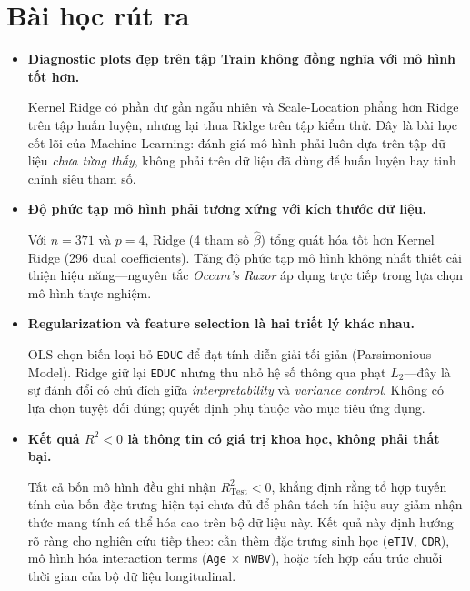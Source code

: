 \newpage

\section{Bài học rút ra}

\begin{itemize}
  \item \textbf{Diagnostic plots đẹp trên tập Train không đồng nghĩa với mô
        hình tốt hơn.}

        Kernel Ridge có phần dư gần ngẫu nhiên và Scale-Location phẳng hơn
        Ridge trên tập huấn luyện, nhưng lại thua Ridge trên tập kiểm thử. Đây
        là bài học cốt lõi của Machine Learning: đánh giá mô hình phải luôn dựa
        trên tập dữ liệu \emph{chưa từng thấy}, không phải trên dữ liệu đã
        dùng để huấn luyện hay tinh chỉnh siêu tham số.
 
  \item \textbf{Độ phức tạp mô hình phải tương xứng với kích thước dữ liệu.}

        Với $n = 371$ và $p = 4$, Ridge (4 tham số $\hat{\beta}$) tổng quát hóa
        tốt hơn Kernel Ridge (296 dual coefficients). Tăng độ phức tạp mô hình
        không nhất thiết cải thiện hiệu năng—nguyên tắc \emph{Occam's Razor}
        áp dụng trực tiếp trong lựa chọn mô hình thực nghiệm.
 
  \item \textbf{Regularization và feature selection là hai triết lý khác nhau.}

        OLS chọn biến loại bỏ \texttt{EDUC} để đạt tính diễn giải tối giản
        (Parsimonious Model). Ridge giữ lại \texttt{EDUC} nhưng thu nhỏ hệ số
        thông qua phạt $L_2$—đây là sự đánh đổi có chủ đích giữa
        \emph{interpretability} và \emph{variance control}. Không có lựa chọn
        tuyệt đối đúng; quyết định phụ thuộc vào mục tiêu ứng dụng.
  
  \item \textbf{Kết quả $R^2 < 0$ là thông tin có giá trị khoa học,
        không phải thất bại.}

        Tất cả bốn mô hình đều ghi nhận $R^2_{\text{Test}} < 0$, khẳng định
        rằng tổ hợp tuyến tính của bốn đặc trưng hiện tại chưa đủ để phân tách
        tín hiệu suy giảm nhận thức mang tính cá thể hóa cao trên bộ dữ liệu
        này. Kết quả này định hướng rõ ràng cho nghiên cứu tiếp theo: cần thêm
        đặc trưng sinh học (\texttt{eTIV}, \texttt{CDR}), mô hình hóa
        interaction terms (\texttt{Age} $\times$ \texttt{nWBV}), hoặc tích hợp
        cấu trúc chuỗi thời gian của bộ dữ liệu longitudinal.
\end{itemize}
 